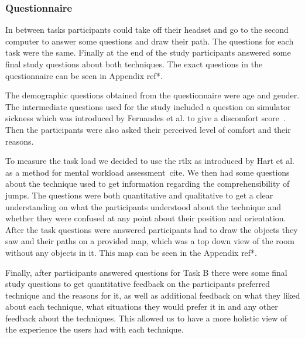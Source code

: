 \subsubsection{Questionnaire}
\label{subsubsection DPUS SP SP: User Feedback}
In between tasks participants could take off their headset and go to the second computer to answer some questions and draw their path. The questions for each task were the same. Finally at the end of the study participants answered some final study questions about both techniques. The exact questions in the questionnaire can be seen in Appendix ref*.

The demographic questions obtained from the questionnaire were age and gender. The intermediate questions used for the study included a question on simulator sickness which was introduced by Fernandes et al. to give a discomfort score~\cite{Fernandes2016}. Then the participants were also asked their perceived level of comfort and their reasons.

To measure the task load we decided to use the \acrfull{rtlx} as introduced by Hart et al. as a method for mental workload assessment~cite. We then had some questions about the technique used to get information regarding the comprehensibility of jumps. The questions were both quantitative and qualitative to get a clear understanding on what the participants understood about the technique and whether they were confused at any point about their position and orientation. After the task questions were answered participants had to draw the objects they saw and their paths on a provided map, which was a top down view of the room without any objects in it. This map can be seen in the Appendix ref*.

Finally, after participants answered questions for Task B there were some final study questions to get quantitative feedback on the participants preferred technique and the reasons for it, as well as additional feedback on what they liked about each technique, what situations they would prefer it in and any other feedback about the techniques. This allowed us to have a more holistic view of the experience the users had with each technique.




